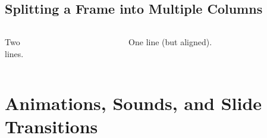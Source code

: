 \documentclass{beamer}
\begin{document}
\subsection{Splitting a Frame into Multiple Columns}
\begin{frame}
  \begin{columns}[t]
      \begin{column}{5cm}
        Two\\lines.
      \end{column}
      \begin{column}{5cm}
        One line (but aligned).
      \end{column}
  \end{columns}
\end{frame}
\section{Animations, Sounds, and Slide Transitions}
\end{document}

